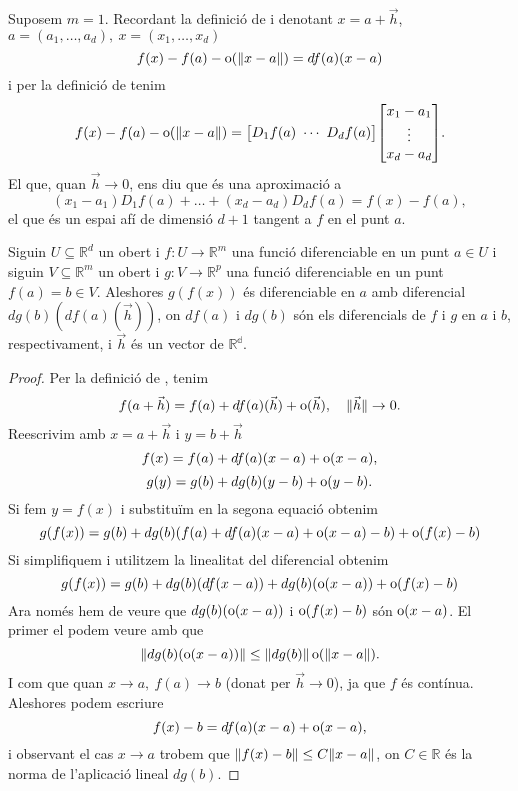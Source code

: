 \documentclass[../Apunts.tex]{subfiles}
\begin{document}
	\begin{observation}\label{obs:diferencial defineix espai tangent}
		Suposem \(m=1\). Recordant la definició de  i denotant \(x=a+\vec{h}\), \(a=(a_{1},\dots,a_{d}),\ x=(x_{1},\dots,x_{d})\)
		\[f(x)-f(a)-\omicron(\norm{x-a})=df(a)(x-a)\]
		i per la definició de  tenim
		\[f(x)-f(a)-\omicron(\norm{x-a})=
		\left[\begin{matrix}
		D_{1}f(a)~\cdots~D_{d}f(a)
		\end{matrix}\right]
		\left[\begin{matrix}
		x_{1}-a_{1}\\
		\vdots\\
		x_{d}-a_{d}
		\end{matrix}\right].\]
		El que, quan \(\vec{h}\to0\), ens diu que és una aproximació a
		\[(x_{1}-a_{1})D_{1}f(a)+\dots+(x_{d}-a_{d})D_{d}f(a)=f(x)-f(a),\]
		el que és un espai afí de dimensió \(d+1\) tangent a \(f\) en el punt \(a\).
	\end{observation}
	\begin{theorem}
		\label{thm:regla de la cadena}
		Siguin \(U\subseteq\mathbb{R}^{d}\) un obert i \(f\colon U\to\mathbb{R}^{m}\) una funció diferenciable en un punt \(a\in U\) i siguin \(V\subseteq\mathbb{R}^{m}\) un obert i \(g\colon V\to\mathbb{R}^{p}\) una funció diferenciable en un punt \(f(a)=b\in V\). Aleshores \(g(f(x))\) és diferenciable en \(a\) amb diferencial \(dg(b)(df(a)(\vec{h}))\), on \(df(a)\) i \(dg(b)\) són els diferencials de \(f\) i \(g\) en \(a\) i \(b\), respectivament, i \(\vec{h}\) és un vector de \(\mathbb{R^{d}}\).
		\begin{proof}
			Per la definició de , tenim
			\[f(a+\vec{h})=f(a)+df(a)(\vec{h})+\operatorname{o}(\vec{h}),\quad\lVert\vec{h}\rVert\to0.\]
			Reescrivim amb \(x=a+\vec{h}\) i \(y=b+\vec{h}\)
			\[f(x)=f(a)+df(a)(x-a)+\operatorname{o}(x-a),\]
			\[g(y)=g(b)+dg(b)(y-b)+\operatorname{o}(y-b).\]
			Si fem \(y=f(x)\) i substituïm en la segona equació obtenim
			\[g(f(x))=g(b)+dg(b)(f(a)+df(a)(x-a)+\operatorname{o}(x-a)-b)+\operatorname{o}(f(x)-b)\]
			Si simplifiquem i utilitzem la linealitat del diferencial obtenim
			\[g(f(x))=g(b)+dg(b)(df(x-a))+dg(b)(\operatorname{o}(x-a))+\operatorname{o}(f(x)-b)\]
			Ara només hem de veure que \(dg(b)(\operatorname{o}(x-a))\) i \(\operatorname{o}(f(x)-b)\) són \(\operatorname{o}(x-a)\). El primer el podem veure amb que
			\[\norm{dg(b)(\omicron(x-a))}\leq\norm{dg(b)}\omicron(\norm{x-a}).\] %
			I com que quan \(x\to a,\ f(a)\to b\) (donat per \(\vec{h}\to0\)), ja que \(f\) és contínua. Aleshores podem escriure
			\[f(x)-b=df(a)(x-a)+\operatorname{o}(x-a),\]
			i  observant el cas \(x\to a\) trobem que \(\norm{f(x)-b}\leq C\norm{x-a}\), on \(C\in\mathbb{R}\) és la norma de l'aplicació lineal \(dg(b)\). %
		\end{proof}
	\end{theorem}
\end{document}
